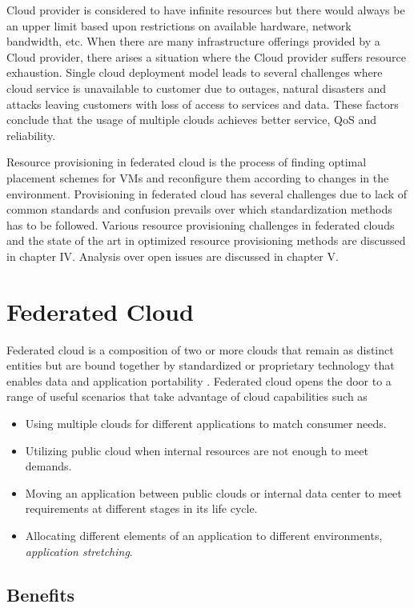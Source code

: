 \documentclass[conference]{IEEEtran}
\begin{document}
Cloud provider is considered to have infinite resources but there would always be an upper limit based upon restrictions on available hardware, network bandwidth, etc. When there are many infrastructure offerings provided by a Cloud provider, there arises a situation where the Cloud provider suffers resource exhaustion. Single cloud deployment model leads to several challenges where cloud service is unavailable to customer due to outages, natural disasters and attacks leaving customers with loss of access to services and data. These factors conclude that the usage of multiple clouds achieves better service, QoS and reliability.

Resource provisioning in federated cloud is the process of finding optimal placement schemes for VMs and reconfigure them according to changes in the environment. Provisioning in federated cloud has several challenges due to lack of common standards and confusion prevails over which standardization methods has to be followed.
Various resource provisioning challenges in federated clouds and the state of the art in optimized resource provisioning methods are discussed in chapter IV. Analysis over open issues are discussed in chapter V.


\section{Federated Cloud}

Federated cloud is a composition of two or more clouds that remain as distinct entities but are bound together by standardized or proprietary technology that enables data and application portability \cite {liu2011nist}.
Federated cloud opens the door to a range of useful scenarios that take advantage of cloud capabilities such as
\begin{itemize}
\item Using multiple clouds for different applications to match consumer needs.
\item Utilizing public cloud when internal resources are not enough to meet demands.
\item Moving an application between public clouds or internal data center to meet requirements at different stages in its life cycle.
\item Allocating different elements of an application to different environments, \textit{application stretching}.

\end{itemize}
\subsection{Benefits}
\end{document}

